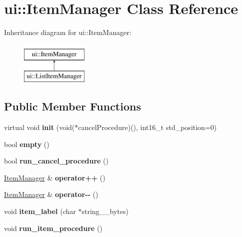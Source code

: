 \hypertarget{classui_1_1_item_manager}{}\section{ui\+::Item\+Manager Class Reference}
\label{classui_1_1_item_manager}
Inheritance diagram for ui\+::Item\+Manager\+:\begin{figure}[H]
\begin{center}
\leavevmode
\includegraphics[height=2.000000cm]{classui_1_1_item_manager}
\end{center}
\end{figure}
\subsection*{Public Member Functions}
\begin{DoxyCompactItemize}
\item 
\mbox{\label{classui_1_1_item_manager_adde1fe4980ce62a484f6f710a292e951}} 
virtual void {\bfseries init} (void($\ast$cancel\+Procedure)(), int16\+\_\+t std\+\_\+position=0)
\item 
\mbox{\label{classui_1_1_item_manager_a9cbc492e3c7baef687a3e1017135336d}} 
bool {\bfseries empty} ()
\item 
\mbox{\label{classui_1_1_item_manager_ac762706e62b0b450123ee0ee178d055d}} 
bool {\bfseries run\+\_\+cancel\+\_\+procedure} ()
\item 
\mbox{\label{classui_1_1_item_manager_a8d91ec39f506ed461e2e32205632c571}} 
\mbox{\hyperlink{classui_1_1_item_manager}{Item\+Manager}} \& {\bfseries operator++} ()
\item 
\mbox{\label{classui_1_1_item_manager_af6122a309715f0243441efc865e24581}} 
\mbox{\hyperlink{classui_1_1_item_manager}{Item\+Manager}} \& {\bfseries operator-\/-\/} ()
\item 
\mbox{\label{classui_1_1_item_manager_a257df52437a70472e4411a5f1288216c}} 
void {\bfseries item\+\_\+label} (char $\ast$string\+\_\+\_\+bytes)
\item 
\mbox{\label{classui_1_1_item_manager_a8ad1725e755a4277b16b236894781b48}} 
void {\bfseries run\+\_\+item\+\_\+procedure} ()
\end{DoxyCompactItemize}
